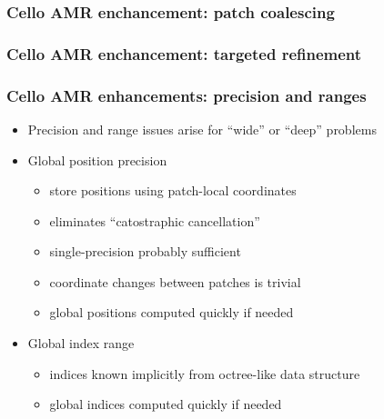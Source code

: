 \begin{frame}[fragile] 
\frametitle{Cello AMR enchancement: patch coalescing}
\end{frame}


\begin{frame}[fragile] 
\frametitle{Cello AMR enchancement: targeted refinement}
\end{frame}

\begin{frame}[fragile] 
\frametitle{Cello AMR enhancements: precision and ranges}
\begin{itemize}
\item Precision and range issues arise for ``wide'' or ``deep'' problems
\item    Global position precision
\begin{itemize}
\item store positions using patch-local coordinates
\item eliminates ``catostraphic cancellation''
\item single-precision probably sufficient
\item coordinate changes between patches is trivial
\item global positions computed quickly if needed
\end{itemize}
\item Global index range
\begin{itemize}
\item indices known implicitly from octree-like data structure
\item global indices computed quickly if needed
\end{itemize}
\end{itemize}
\end{frame}

